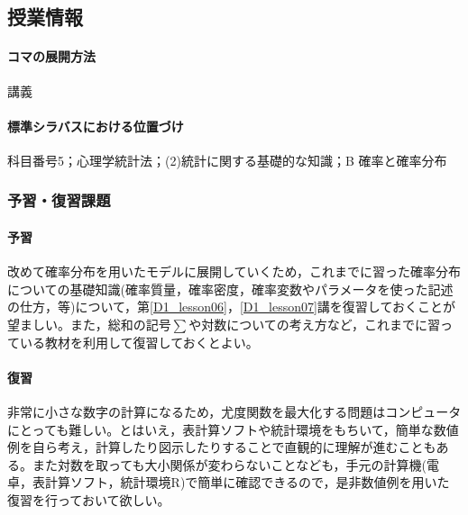 \subsection{授業情報}
\paragraph{コマの展開方法}
講義
\paragraph{標準シラバスにおける位置づけ}
科目番号5；心理学統計法；(2)統計に関する基礎的な知識；B 確率と確率分布
\subsubsection{予習・復習課題}
\paragraph{予習}
改めて確率分布を用いたモデルに展開していくため，これまでに習った確率分布についての基礎知識(確率質量，確率密度，確率変数やパラメータを使った記述の仕方，等)について，第\ref{D1_lesson06}，\ref{D1_lesson07}講を復習しておくことが望ましい。また，総和の記号$\sum$や対数についての考え方など，これまでに習っている教材を利用して復習しておくとよい。
\paragraph{復習}
非常に小さな数字の計算になるため，尤度関数を最大化する問題はコンピュータにとっても難しい。とはいえ，表計算ソフトや統計環境をもちいて，簡単な数値例を自ら考え，計算したり図示したりすることで直観的に理解が進むこともある。また対数を取っても大小関係が変わらないことなども，手元の計算機(電卓，表計算ソフト，統計環境R)で簡単に確認できるので，是非数値例を用いた復習を行っておいて欲しい。